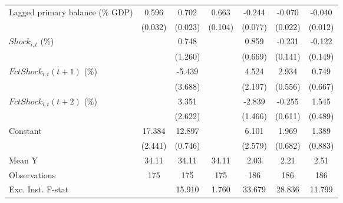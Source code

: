 {\begin{tabular}{l*{6}{c}}
\addlinespace
Lagged primary balance (\% GDP)&       0.596\sym{***}&       0.702\sym{***}&       0.663\sym{***}&      -0.244\sym{***}&      -0.070\sym{**} &      -0.040\sym{***}\\
                    &     (0.032)         &     (0.023)         &     (0.104)         &     (0.077)         &     (0.022)         &     (0.012)         \\
\addlinespace
$ Shock_{i,t}$ (\%) &                     &       0.748         &                     &       0.859         &      -0.231         &      -0.122         \\
                    &                     &     (1.260)         &                     &     (0.669)         &     (0.141)         &     (0.149)         \\
\addlinespace
$ FctShock_{i,t}(t+1)$ (\%)&                     &      -5.439         &                     &       4.524\sym{*}  &       2.934\sym{***}&       0.749         \\
                    &                     &     (3.688)         &                     &     (2.197)         &     (0.556)         &     (0.667)         \\
\addlinespace
$ FctShock_{i,t}(t+2)$ (\%)&                     &       3.351         &                     &      -2.839\sym{*}  &      -0.255         &       1.545\sym{**} \\
                    &                     &     (2.622)         &                     &     (1.466)         &     (0.611)         &     (0.489)         \\
\addlinespace
Constant            &      17.384\sym{***}&      12.897\sym{***}&                     &       6.101\sym{**} &       1.969\sym{**} &       1.389         \\
                    &     (2.441)         &     (0.746)         &                     &     (2.579)         &     (0.682)         &     (0.883)         \\
\midrule
Mean Y              &       34.11         &       34.11         &       34.11         &        2.03         &        2.21         &        2.51         \\
Observations        &         175         &         175         &         175         &         186         &         186         &         186         \\
Exc. Inst. F-stat   &                     &      15.910         &       1.760         &      33.679         &      28.836         &      11.799         \\
\bottomrule
\end{tabular}
}
